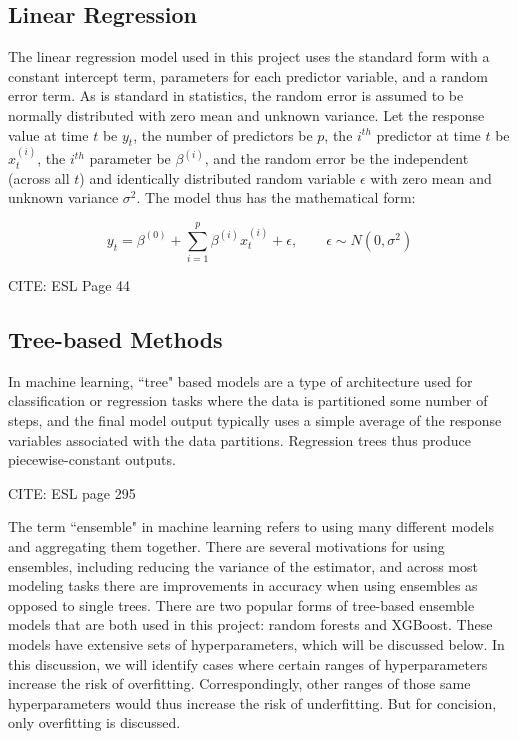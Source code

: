 
\subsection*{Linear Regression}

The linear regression model used in this project uses the standard form with a constant intercept term, parameters for each predictor variable, and a random error term. As is standard in statistics, the random error is assumed to be normally distributed with zero mean and unknown variance. Let the response value at time $t$ be $y_t$, the number of predictors be $p$, the $i^{th}$ predictor at time $t$ be $x^{(i)}_t$, the $i^{th}$ parameter be $\beta^{(i)}$, and the random error be the  independent (across all $t$) and identically distributed random variable $\epsilon$ with zero mean and unknown variance $\sigma^2$. The model thus has the mathematical form:

\[
y_t = \beta^{(0)} + \sum_{i=1}^p \beta^{(i)} x^{(i)}_t + \epsilon, \qquad \epsilon\sim N(0, \sigma^2)
\]

CITE: ESL Page 44

\subsection*{Tree-based Methods}

In machine learning, ``tree" based models are a type of architecture used for classification or regression tasks where the data is partitioned some number of steps, and the final model output typically uses a simple average of the response variables associated with the data partitions. Regression trees thus produce piecewise-constant outputs.

CITE: ESL page 295

The term ``ensemble" in machine learning refers to using many different models and aggregating them together. There are several motivations for using ensembles, including reducing the variance of the estimator, and across most modeling tasks there are improvements in accuracy when using ensembles as opposed to single trees. There are two popular forms of tree-based ensemble models that are both used in this project: random forests and XGBoost. These models have extensive sets of hyperparameters, which will be discussed below. In this discussion, we will identify cases where certain ranges of hyperparameters increase the risk of overfitting. Correspondingly, other ranges of those same hyperparameters would thus increase the risk of underfitting. But for concision, only overfitting is discussed.


